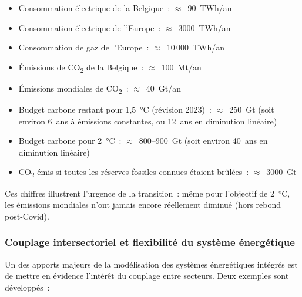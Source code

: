 \begin{itemize}
    \item Consommation électrique de la Belgique~: $\approx$~90~TWh/an
    \item Consommation électrique de l'Europe~: $\approx$~3000~TWh/an
    \item Consommation de gaz de l'Europe~: $\approx$~10\,000~TWh/an
    \item Émissions de CO\textsubscript{2} de la Belgique~: $\approx$~100~Mt/an
    \item Émissions mondiales de CO\textsubscript{2}~: $\approx$~40~Gt/an
    \item Budget carbone restant pour 1,5~°C (révision 2023)~: $\approx$~250~Gt (soit environ 6~ans à émissions constantes, ou 12~ans en diminution linéaire)
    \item Budget carbone pour 2~°C~: $\approx$~800--900~Gt (soit environ 40~ans en diminution linéaire)
    \item CO\textsubscript{2} émis si toutes les réserves fossiles connues étaient brûlées~: $\approx$~3000~Gt
\end{itemize}

Ces chiffres illustrent l'urgence de la transition~: même pour l'objectif de 2~°C, les émissions mondiales n'ont jamais encore réellement diminué (hors rebond post-Covid).

\subsubsection{Couplage intersectoriel et flexibilité du système énergétique}

Un des apports majeurs de la modélisation des systèmes énergétiques intégrés est de mettre en évidence l'intérêt du couplage entre secteurs. Deux exemples sont développés~:

